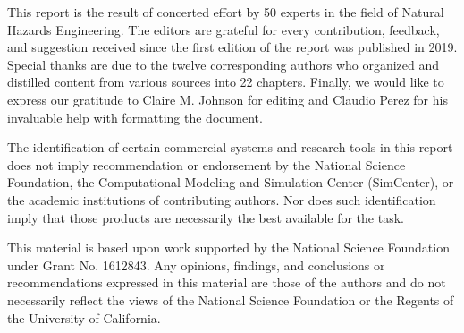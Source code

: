 %
%


This report is the result of concerted effort by 50 experts in the field of Natural Hazards Engineering. The editors are grateful for every contribution, feedback, and suggestion received since the first edition of the report was published in 2019. Special thanks are due to the twelve corresponding authors who organized and distilled content from various sources into 22 chapters. Finally, we would like to express our gratitude to Claire M. Johnson for editing and Claudio Perez for his invaluable help with formatting the document.


The identification of certain commercial systems and research tools in this report does not imply recommendation or endorsement by the National Science Foundation, the Computational Modeling and Simulation Center (SimCenter), or the academic institutions of contributing authors. Nor does such identification imply that those products are necessarily the best available for the task. 


This material is based upon work supported by the National Science Foundation under Grant No. 1612843. Any opinions, findings, and conclusions or recommendations expressed in this material are those of the authors and do not necessarily reflect the views of the National Science Foundation or the Regents of the University of California.

